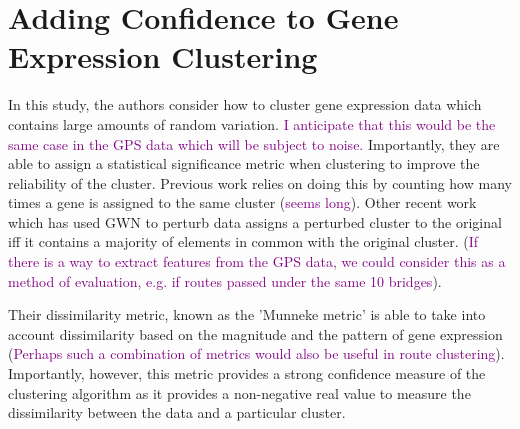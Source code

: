 \documentclass{article}
\newcommand\NOTE[1]{\textcolor{purple}{#1}}
\begin{document}
    \section{Adding Confidence to Gene Expression Clustering}

    In this study, the authors consider how to cluster gene expression data which contains large amounts of random variation. \NOTE{I anticipate that this would be the same case in the GPS data which will be subject to noise.} Importantly, they are able to assign a statistical significance metric when clustering to improve the reliability of the cluster. Previous work relies on doing this by counting how many times a gene is assigned to the same cluster (\NOTE{seems long}). Other recent work which has used GWN to perturb data assigns a perturbed cluster to the original iff it contains a majority of elements in common with the original cluster. (\NOTE{If there is a way to extract features from the GPS data, we could consider this as a method of evaluation, e.g. if routes passed under the same 10 bridges}). 

    Their dissimilarity metric, known as the 'Munneke metric' is able to take into account dissimilarity based on the magnitude and the pattern of gene expression (\NOTE{Perhaps such a combination of metrics would also be useful in route clustering}). Importantly, however, this metric provides a strong confidence measure of the clustering algorithm as it provides a non-negative real value to measure the dissimilarity between the data and a particular cluster.
\end{document}
